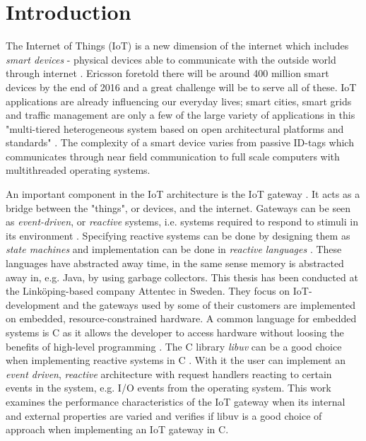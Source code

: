 \chapter{Introduction}
\label{cha:introduction}

The Internet of Things (IoT) is a new dimension of the internet which includes
\textit{smart devices} - physical devices able to communicate with the outside
world through internet
\cite{design-principles-for-distributed-embedded-applications}
\cite{wu2011m2m}. Ericsson foretold there will be around 400 million smart
devices by the end of 2016 \cite{ericsson-iot-forecast} and a great challenge
will be to serve all of these. IoT applications are already influencing our
everyday lives; smart cities, smart grids and traffic management are only a few
of the large variety of applications in this "multi-tiered heterogeneous system
based on open architectural platforms and standards" \cite{gardavsevic2017iot}.
The complexity of a smart device varies from passive ID-tags which communicates
through near field communication to full scale computers with multithreaded
operating systems.

An important component in the IoT architecture is the IoT gateway
\cite{chen2011brief}. It acts as a bridge between the "things", or devices, and
the internet. Gateways can be seen as \textit{event-driven}, or
\textit{reactive} systems, i.e. systems required to respond to stimuli in its
environment \cite{garlan1993introduction} \cite{harel1985development}.
Specifying reactive systems can be done by designing them as \textit{state
machines} and implementation can be done in \textit{reactive languages}
\cite{bainomugisha2013survey}. These languages have abstracted away time, in
the same sense memory is abstracted away in, e.g. Java, by using garbage
collectors. This thesis has been conducted at the Linköping-based company
Attentec in Sweden. They focus on IoT-development and the gateways used by some
of their customers are implemented on embedded, resource-constrained hardware.
A common language for embedded systems is C as it allows the developer to
access hardware without loosing the benefits of high-level programming
\cite{nahas2012choosing} \cite{barr1999programming}. The C library
\textit{libuv} can be a good choice when implementing reactive systems in C
\cite{libuv-webpage}. With it the user can implement an \textit{event driven},
\textit{reactive} architecture with request handlers reacting to certain events
in the system, e.g. I/O events from the operating system. This work examines
the performance characteristics of the IoT gateway when its internal and
external properties are varied and verifies if libuv is a good choice of
approach when implementing an IoT gateway in C.

